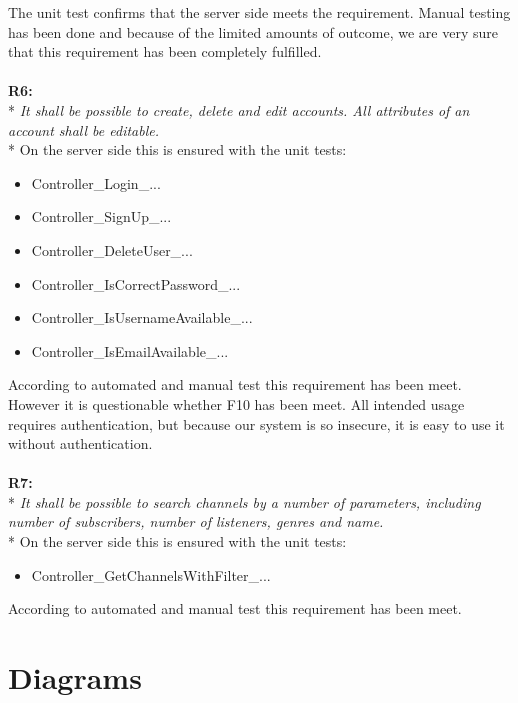 \documentclass[a4paper,11pt,report]{article}
\begin{document}
The unit test confirms that the server side meets the requirement. Manual testing has been done and because of the limited amounts of outcome, we are very sure that this requirement has been completely fulfilled. \\ \\
\textbf{R6:} \\*
\textit{It shall be possible to create, delete and edit accounts. All attributes of an account shall be editable.} \\*
On the server side this is ensured with the unit tests:
\begin{itemize}
\item Controller\_Login\_...
\item Controller\_SignUp\_...
\item Controller\_DeleteUser\_...
\item Controller\_IsCorrectPassword\_...
\item Controller\_IsUsernameAvailable\_...
\item Controller\_IsEmailAvailable\_...
\end{itemize}
According to automated and manual test this requirement has been meet. However it is questionable whether F10 has been meet. All intended usage requires authentication, but because our system is so insecure, it is easy to use it without authentication. \\ \\
\textbf{R7:} \\*
\textit{It shall be possible to search channels by a number of parameters, including number of subscribers, number of listeners, genres and name.} \\*
On the server side this is ensured with the unit tests:
\begin{itemize}
\item Controller\_GetChannelsWithFilter\_...
\end{itemize}
According to automated and manual test this requirement has been meet.
\newpage
\section{Diagrams}
\end{document}
